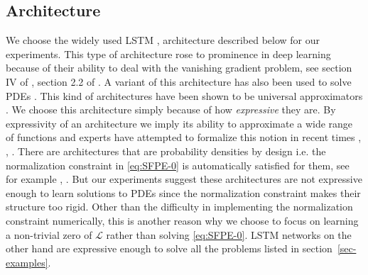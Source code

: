 \subsection{Architecture}\label{ssec-architecture}
We choose the widely used LSTM \cite{sherstinsky2020fundamentals}, \cite{vennerod2021long} architecture described below for our experiments. This type of architecture rose to prominence in deep learning because of their ability to deal with the vanishing gradient problem, see section IV of \cite{sherstinsky2020fundamentals}, section 2.2 of \cite{vennerod2021long}. A variant of this architecture has also been used to solve PDEs \cite{sirignano2018dgm}. This kind of architectures have been shown to be universal approximators \cite{schafer2006recurrent}. We choose this architecture simply because of how \textit{expressive} they are. By  expressivity of an architecture we imply its ability to approximate a wide range of functions and experts have attempted to formalize this notion in recent times \cite{lu2017expressive}, \cite{raghu2016survey},  \cite{raghu2017expressive}. There are architectures that are probability densities by design i.e. the normalization constraint in \eqref{eq:SFPE-0} is automatically satisfied for them, see for example \cite{uria2013rnade}, \cite{papamakarios2019neural}. But our experiments suggest these architectures are not expressive enough to learn solutions to PDEs since the normalization constraint makes their structure too rigid. Other than the difficulty in implementing the normalization constraint numerically, this is another reason why we choose to focus on learning a non-trivial zero of $\mathcal L$ rather than solving \eqref{eq:SFPE-0}. LSTM networks on the other hand are expressive enough to solve all the problems listed in section~\ref{sec-examples}.

